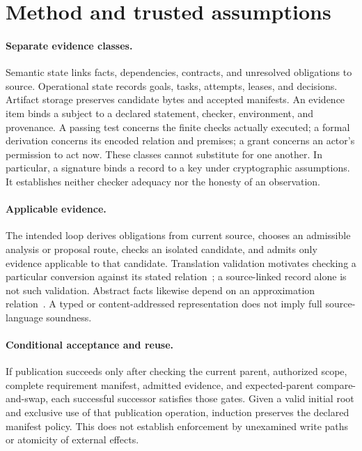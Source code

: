 \section{Method and trusted assumptions}
\label{sec:evidence-method}

\paragraph{Separate evidence classes.}
Semantic state links facts, dependencies, contracts, and unresolved obligations
to source. Operational state records goals, tasks, attempts, leases, and
decisions. Artifact storage preserves candidate bytes and accepted manifests.
An evidence item binds a subject to a declared statement, checker, environment,
and provenance. A passing test concerns the finite checks actually executed;
a formal derivation concerns its encoded relation and premises; a grant concerns
an actor's permission to act now. These classes cannot substitute for one another.
In particular, a signature binds a record to a key under cryptographic
assumptions. It establishes neither checker adequacy nor the honesty of an
observation.

\paragraph{Applicable evidence.}
The intended loop derives obligations from current source, chooses an
admissible analysis or proposal route, checks an isolated candidate, and admits
only evidence applicable to that candidate. Translation validation motivates
checking a particular conversion against its stated relation~\citep{baseline04};
a source-linked record alone is not such validation. Abstract facts likewise
depend on an approximation relation~\citep{baseline02}. A typed or
content-addressed representation does not imply full source-language soundness.

\paragraph{Conditional acceptance and reuse.}
If publication succeeds only after checking the current parent, authorized
scope, complete requirement manifest, admitted evidence, and expected-parent
compare-and-swap, each successful successor satisfies those gates. Given a valid
initial root and exclusive use of that publication operation, induction
preserves the declared manifest policy. This does not establish enforcement by
unexamined write paths or atomicity of external effects.


